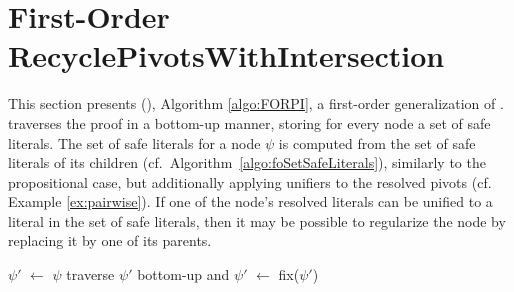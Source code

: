 \section{First-Order RecyclePivotsWithIntersection}
\label{sec:FORPI}
This section presents {\FirstOrderRPI} ({\FORPI}), Algorithm \ref{algo:FORPI}, a first-order generalization of {\RPI}.
{\FORPI} traverses the proof in a bottom-up manner, storing for every node a set of safe literals. The set of safe literals for a node $\psi$ is computed from the set of safe literals of its children (cf.\ Algorithm~\ref{algo:foSetSafeLiterals}), similarly to the propositional case, but additionally applying unifiers to the resolved pivots (cf. Example \ref{ex:pairwise}).
If one of the node's resolved literals can be unified to a literal in the set of safe literals, then it may be possible to regularize the node by replacing it by one of its parents.  


\newcommand{\la}{\leftarrow}
\begin{algorithm}[bt]
\begin{footnotesize}


\BlankLine

$\psi'$ $\la$ $\psi$\;
traverse $\psi'$ bottom-up and 
$\psi'$ $\la$ fix($\psi'$) \;
\;
\caption{\label{algo:FORPI} \texttt{\FORPI}}
\end{footnotesize}
\end{algorithm}


